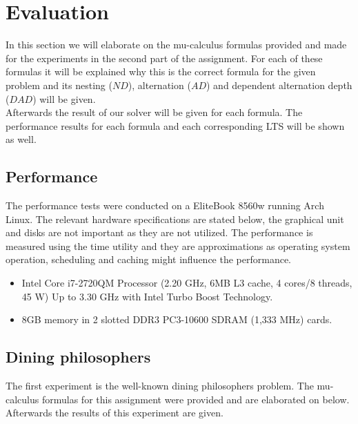 \documentclass[10pt,a4paper]{article}
\begin{document}
\section{Evaluation}\label{eval}
In this section we will elaborate on the mu-calculus formulas provided and made for the experiments in the second part of the assignment. For each of these formulas it will be explained why this is the correct formula for the given problem and its nesting ($ND$), alternation ($AD$) and dependent alternation depth ($DAD$) will be given.\\
Afterwards the result of our solver will be given for each formula. The performance results for each formula and each corresponding LTS will be shown as well.

\subsection{Performance}

The performance tests were conducted on a EliteBook 8560w running Arch Linux. The relevant hardware specifications are stated below, the graphical unit and disks are not important as they are not utilized. The performance is measured using the time utility and they are approximations as operating system operation, scheduling and caching might influence the performance.

\begin{itemize}
	\item Intel Core i7-2720QM Processor (2.20 GHz, 6MB L3 cache, 4 cores/8 threads, 45 W) Up to 3.30 GHz with Intel Turbo Boost Technology.
	
	\item 8GB memory in 2 slotted DDR3 PC3-10600 SDRAM (1,333 MHz) cards.
\end{itemize}

\subsection{Dining philosophers}
The first experiment is the well-known dining philosophers problem. The mu-calculus formulas for this assignment were provided and are elaborated on below. Afterwards the results of this experiment are given.
\end{document}
